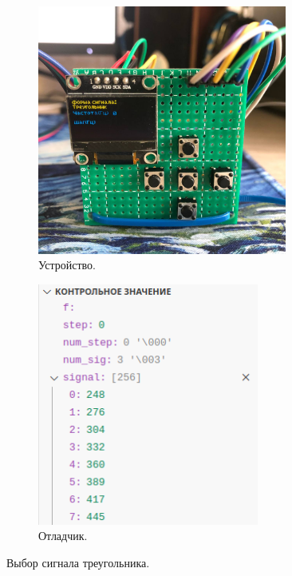 	\begin{figure}[H]
     \begin{subfigure}[H]{0.5\textwidth}
         \centering
         \includegraphics[width=0.9\textwidth]{../image/test3_u_s.jpg}
         \caption{Устройство.}
     \end{subfigure}
     \hfill
     \begin{subfigure}[H]{0.5\textwidth}
         \centering
         \includegraphics[width=0.8\textwidth]{../image/test3_o_s.png}
         \caption{Отладчик.}
     \end{subfigure}
        \caption{Выбор сигнала треугольника.}
	\end{figure}
	
